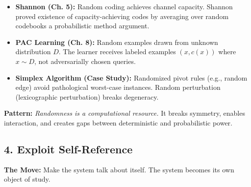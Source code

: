\begin{itemize}
\item \textbf{Shannon (Ch. 5):} Random coding achieves channel capacity. Shannon proved existence of capacity-achieving codes by averaging over random codebooks a probabilistic method argument.

\item \textbf{PAC Learning (Ch. 8):} Random examples drawn from unknown distribution $D$. The learner receives labeled examples $(x, c(x))$ where $x \sim D$, not adversarially chosen queries.

\item \textbf{Simplex Algorithm (Case Study):} Randomized pivot rules (e.g., random edge) avoid pathological worst-case instances. Random perturbation (lexicographic perturbation) breaks degeneracy.
\end{itemize}

\textbf{Pattern:} \emph{Randomness is a computational resource.} It breaks symmetry, enables interaction, and creates gaps between deterministic and probabilistic power.
\subsection{4. Exploit Self-Reference}
\label{sec:anatomy:selfref}

\textbf{The Move:} Make the system talk about itself. The system becomes its own object of study.


